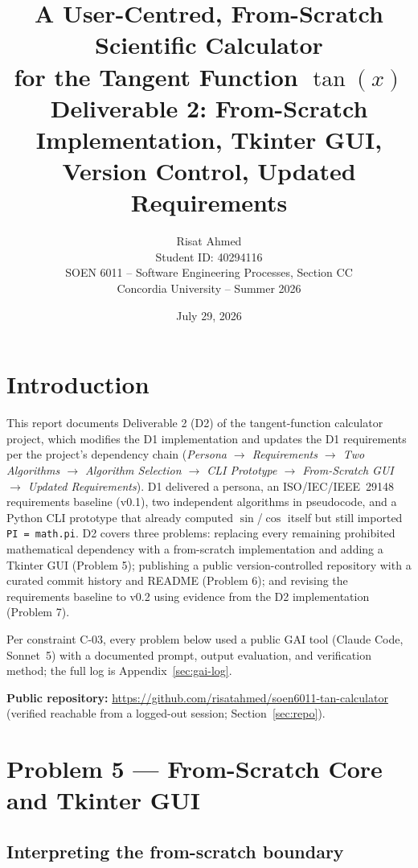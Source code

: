 \documentclass[11pt]{article}
\title{\textbf{A User-Centred, From-Scratch Scientific Calculator\\ for the Tangent Function $\tan(x)$}\\[0.3cm]
\large Deliverable 2: From-Scratch Implementation, Tkinter GUI, Version Control, Updated Requirements}
\author{Risat Ahmed \\ Student ID: 40294116 \\ SOEN 6011 -- Software Engineering Processes, Section CC \\ Concordia University -- Summer 2026}
\date{July 29, 2026}
\begin{document}
\maketitle
\thispagestyle{empty}
\newpage

\tableofcontents
\newpage

\section{Introduction}

This report documents Deliverable 2 (D2) of the tangent-function calculator project, which modifies the D1 implementation and updates the D1 requirements per the project's dependency chain (\emph{Persona $\to$ Requirements $\to$ Two Algorithms $\to$ Algorithm Selection $\to$ CLI Prototype $\to$ From-Scratch GUI $\to$ Updated Requirements}). D1 delivered a persona, an ISO/IEC/IEEE~29148 requirements baseline (v0.1), two independent algorithms in pseudocode, and a Python CLI prototype that already computed $\sin$/$\cos$ itself but still imported \texttt{PI = math.pi}. D2 covers three problems: replacing every remaining prohibited mathematical dependency with a from-scratch implementation and adding a Tkinter GUI (Problem 5); publishing a public version-controlled repository with a curated commit history and README (Problem 6); and revising the requirements baseline to v0.2 using evidence from the D2 implementation (Problem 7).

Per constraint C-03, every problem below used a public GAI tool (Claude Code, Sonnet~5) with a documented prompt, output evaluation, and verification method; the full log is Appendix~\ref{sec:gai-log}.

\textbf{Public repository:} \url{https://github.com/risatahmed/soen6011-tan-calculator} (verified reachable from a logged-out session; Section~\ref{sec:repo}).

\section{Problem 5 --- From-Scratch Core and Tkinter GUI}

\subsection{Interpreting the from-scratch boundary}
\end{document}
